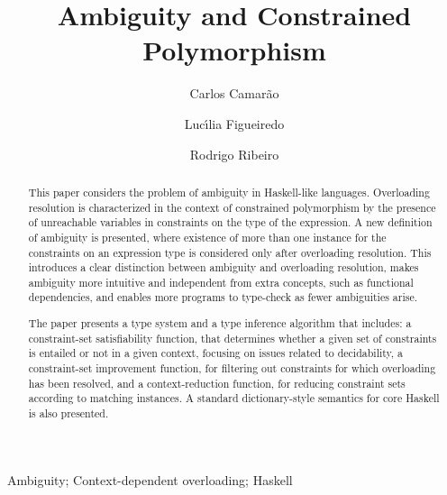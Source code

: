 \documentclass[review]{elsarticle}
\begin{document}
\begin{frontmatter}

\title{Ambiguity and Constrained Polymorphism}

\author{Carlos Camar\~ao}
\address{Dep. de Ci\^encia da Computa\c{c}\~ao, Universidade Federal
  de Minas Gerais, Av. Ant\^onio Carlos 6627, Belo Horizonte, Minas Gerais, Brasil}

\author{Luc\'{\i}lia Figueiredo}
\address{Dep. de Computa\c{c}\~ao, Universidade
  Federal de Ouro Preto, ICEB, Campus Universit\'ario Morro do
  Cruzeiro, Ouro Preto, Minas Gerais, Brasil}

\author{Rodrigo Ribeiro}

\address[rgr]{Dep. de Computa\c{c}\~ao e Sistemas, Universidade
  Federal de Ouro Preto, ICEA, Jo\~ao Monlevade, Minas Gerais, Brasil}

\begin{abstract}

This paper considers the problem of ambiguity in Haskell-like
languages. Overloading resolution is characterized in the context of
constrained polymorphism by the presence of unreachable variables in
constraints on the type of the expression. A new definition of
ambiguity is presented, where existence of more than one instance for
the constraints on an expression type is considered only after
overloading resolution. This introduces a clear distinction between
ambiguity and overloading resolution, makes ambiguity more intuitive
and independent from extra concepts, such as functional dependencies,
and enables more programs to type-check as fewer ambiguities arise.

The paper presents a type system and a type inference algorithm that
includes: a constraint-set satisfiability function, that determines
whether a given set of constraints is entailed or not in a given
context, focusing on issues related to decidability, a constraint-set
improvement function, for filtering out constraints for which
overloading has been resolved, and a context-reduction function, for
reducing constraint sets according to matching instances. A standard
dictionary-style semantics for core Haskell is also presented.

\end{abstract}

\begin{keyword}
Ambiguity; Context-dependent overloading; Haskell
\end{keyword}

\end{frontmatter}
\end{document}
